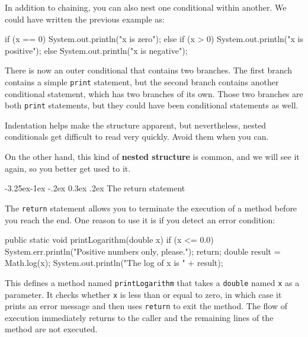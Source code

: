 \documentclass[12pt]{book}
\makeatletter
\renewcommand\subsection{\@startsection{subsection}{2}{\z@}%
    {-3.25ex\@plus -1ex \@minus -.2ex}%
    {0.3ex \@plus .2ex}%
    {\normalfont\large\bfseries}}
\theoremstyle{exercise}
\makeatother
\begin{document}
In addition to chaining, you can also nest one conditional within another.
We could have written the previous example as:

\begin{code}
    if (x == 0) {
        System.out.println("x is zero");
    } else {
        if (x > 0) {
            System.out.println("x is positive");
        } else {
            System.out.println("x is negative");
        }
    }
\end{code}

There is now an outer conditional that contains two branches.
The first branch contains a simple {\tt print} statement, but the second branch contains another conditional statement, which has two branches of its own.
Those two branches are both {\tt print} statements, but they could have been conditional statements as well.

Indentation helps make the structure apparent, but nevertheless, nested conditionals get difficult to read very quickly.
Avoid them when you can.


On the other hand, this kind of {\bf nested structure} is common, and we will see it again, so you better get used to it.

\subsection{The return statement}


The {\tt return} statement allows you to terminate the execution of a method before you reach the end.
One reason to use it is if you detect an error condition:

\begin{code}
    public static void printLogarithm(double x) {
        if (x <= 0.0) {
            System.err.println("Positive numbers only, please.");
            return;
        }
        double result = Math.log(x);
        System.out.println("The log of x is " + result);
    }
\end{code}

This defines a method named {\tt printLogarithm} that takes a {\tt  double} named {\tt x} as a parameter.
It checks whether {\tt  x} is less than or equal to zero, in which case it prints an error message and then uses {\tt return} to exit the method.
The flow of execution immediately returns to the caller and the remaining lines of the method are not executed.
\end{document}
